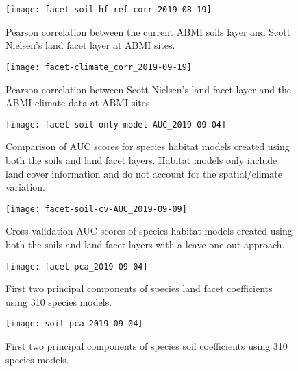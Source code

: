 \documentclass[12pt]{article}
\begin{document}
\begin{figure}[!htb]
\texttt{[image: facet-soil-hf-ref\_corr\_2019-08-19]}
\caption{Pearson correlation between the current ABMI soils layer and Scott Nielsen’s land facet layer at ABMI sites.}
\centering
\label{fig:Corr}
\end{figure}

\begin{figure}[!htb]
\texttt{[image: facet-climate\_corr\_2019-09-19]}
\caption{Pearson correlation between Scott Nielsen’s land facet layer and the ABMI climate data at ABMI sites.}
\centering
\label{fig:Climate}
\end{figure}

\begin{figure}[!htb]
\texttt{[image: facet-soil-only-model-AUC\_2019-09-04]}
\caption{Comparison of AUC scores for species habitat models created using both the soils and land facet layers. Habitat models only include land cover information and do not account for the spatial/climate variation.}
\centering
\label{fig:AUC}
\end{figure}


\begin{figure}[!htb]
\texttt{[image: facet-soil-cv-AUC\_2019-09-09]}
\caption{Cross validation AUC scores of species habitat models created using both the soils and land facet layers with a leave-one-out approach.}
\centering
\label{fig:CV}
\end{figure}

\begin{figure}[!htb]
\texttt{[image: facet-pca\_2019-09-04]}
\caption{First two principal components of species land facet coefficients using 310 species models.}
\centering
\label{fig:facetPCA}
\end{figure}

\begin{figure}[!htb]
\texttt{[image: soil-pca\_2019-09-04]}
\caption{First two principal components of species soil coefficients using 310 species models.}
\centering
\label{fig:SoilPCA}
\end{figure}
\end{document}
